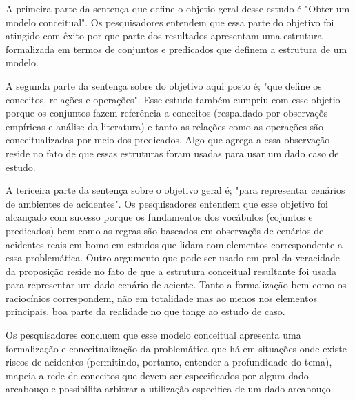A primeira parte da sentença que define o objetio geral desse estudo é "Obter um modelo conceitual". Os pesquisadores entendem que essa parte do objetivo foi atingido com êxito por que parte dos resultados apresentam uma estrutura formalizada em termos de conjuntos e predicados que definem a estrutura de um modelo. 

A segunda parte da sentença sobre do objetivo aqui posto é; "que define os conceitos, relações e operações". Esse estudo também cumpriu com esse objetio porque os conjuntos fazem referência a conceitos (respaldado por observaçõs empíricas e análise da literatura) e tanto as relações como as operações são conceitualizadas por meio dos predicados. Algo que agrega a essa observação reside no fato de que essas estruturas foram usadas para usar um dado caso de estudo.

A tericeira parte da sentença sobre o objetivo geral é; "para representar cenários de ambientes de acidentes". Os pesquisadores entendem que esse objetivo foi alcançado com sucesso porque os fundamentos dos vocábulos (cojuntos e predicados) bem como as regras são baseados em observaçõs de cenários de acidentes reais em bomo em estudos que lidam com elementos correspondente a essa problemática. Outro argumento que pode ser usado em prol da veracidade da proposição reside no fato de que a estrutura conceitual resultante foi usada para representar um dado cenário de aciente. Tanto a formalização bem como os raciocínios correspondem, não em totalidade mas ao menos nos elementos principais, boa parte da realidade no que tange ao estudo de caso. 

Os pesquisadores concluem que esse modelo conceitual apresenta uma formalização e conceitualização da problemática que há em situações onde existe riscos de acidentes (permitindo, portanto, entender a profundidade do tema), mapeia a rede de conceitos que devem ser especificados por algum dado arcabouço e possibilita arbitrar a utilização especifica de um dado arcabouço.
